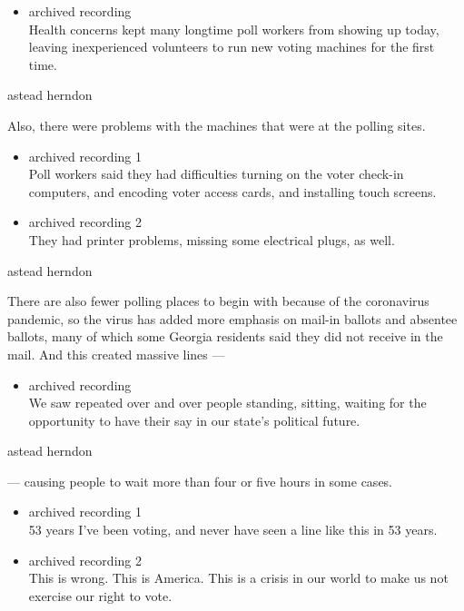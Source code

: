 \begin{itemize}
\tightlist
\item
  archived recording\\
  Health concerns kept many longtime poll workers from showing up today,
  leaving inexperienced volunteers to run new voting machines for the
  first time.
\end{itemize}

astead herndon

Also, there were problems with the machines that were at the polling
sites.

\begin{itemize}
\item
  archived recording 1\\
  Poll workers said they had difficulties turning on the voter check-in
  computers, and encoding voter access cards, and installing touch
  screens.
\item
  archived recording 2\\
  They had printer problems, missing some electrical plugs, as well.
\end{itemize}

astead herndon

There are also fewer polling places to begin with because of the
coronavirus pandemic, so the virus has added more emphasis on mail-in
ballots and absentee ballots, many of which some Georgia residents said
they did not receive in the mail. And this created massive lines ---

\begin{itemize}
\tightlist
\item
  archived recording\\
  We saw repeated over and over people standing, sitting, waiting for
  the opportunity to have their say in our state's political future.
\end{itemize}

astead herndon

--- causing people to wait more than four or five hours in some cases.

\begin{itemize}
\item
  archived recording 1\\
  53 years I've been voting, and never have seen a line like this in 53
  years.
\item
  archived recording 2\\
  This is wrong. This is America. This is a crisis in our world to make
  us not exercise our right to vote.
\end{itemize}

